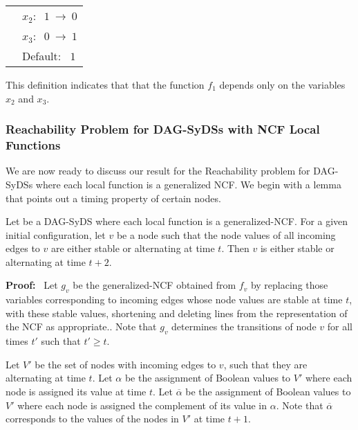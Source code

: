 \medskip

\noindent
\begin{tabular}{ll}
\hspace*{1.1in} & $x_2:~$  $1 ~\longrightarrow~ 0$ \\ [1ex]
\hspace*{1.1in} & $x_3:~$  $0 ~\longrightarrow~ 1$ \\ [1ex]
\hspace*{1.1in} & Default:~ $1$ \\
\end{tabular}

\smallskip

\noindent
This definition indicates that that the function $f_1$
depends only on the variables $x_2$ and $x_3$.

\medskip

\noindent
\subsubsection{Reachability Problem for DAG-SyDSs with NCF Local Functions}

\medskip

We are now ready to discuss our result for the Reachability problem
for DAG-SyDSs where each local function is a generalized NCF.
We begin with a lemma that points out a timing property of certain nodes.

\begin{lemma}\label{lem:ncf_plus_two}
Let \cals{} be a DAG-SyDS where each local function is a generalized-NCF.
For a given initial configuration,
let $v$ be a node such that the node values of all incoming edges to $v$
are  either stable or alternating at time $t$.
Then  $v$ is either stable or alternating at time $t+2$.
\end{lemma}

\medskip

\noindent
\textbf{Proof:}~ Let $g_v$ be the generalized-NCF obtained from
$f_v$ by replacing those variables corresponding to incoming edges
whose node values are stable at time $t$, with these stable values,
shortening and deleting lines from the representation of the NCF
as appropriate..  Note that $g_v$ determines the transitions of
node $v$ for all times $t'$ such that $t' \geq t$.

Let $V'$ be the set of nodes with incoming edges to $v$, such that
they are alternating at time $t$.  Let $\alpha$  be the assignment
of Boolean values to $V'$ where each node  is assigned its value
at time $t$.  Let $\overline{\alpha}$  be the assignment of Boolean
values to $V'$ where each node  is assigned the complement of its
value in $\alpha$.  Note that $\overline{\alpha}$ corresponds to
the values of the nodes in $V'$ at time $t+1$.

